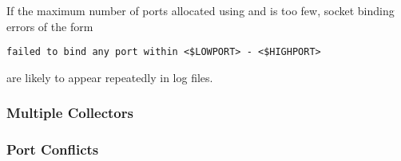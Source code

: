 If the maximum number of ports allocated using 
 and 
is too few,
socket binding errors of the form
\footnotesize
\begin{verbatim}
failed to bind any port within <$LOWPORT> - <$HIGHPORT>
\end{verbatim}
\normalsize
are likely to appear repeatedly in log files.


\subsubsection{\label{sec:Ports-MultipleCollectors}Multiple Collectors}
\Todo


\subsubsection{\label{sec:Ports-Conflicts}Port Conflicts}
\Todo

